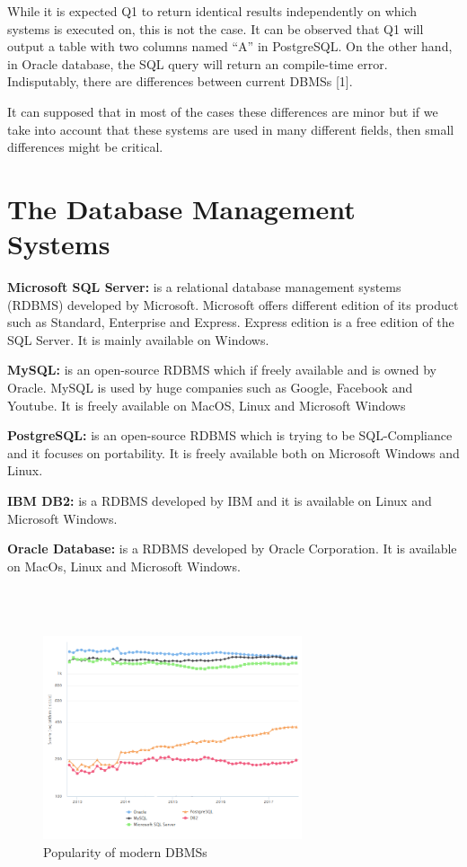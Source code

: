 While it is expected Q1 to return identical results independently on which systems is executed on, this is not the case. It can be observed that Q1 will output a table with two columns named “A” in PostgreSQL. On the other hand, in Oracle database, the SQL query will return an compile-time error. Ιndisputably, there are differences between current DBMSs [1]. 

It can supposed that in most of the cases these differences are minor but if we take into account that these systems are used in many different fields, then small differences might be critical. 

\section{The Database Management Systems} 

\textbf{Microsoft SQL Server:} is a relational database management systems (RDBMS) developed by Microsoft. Microsoft offers different edition of its product such as Standard, Enterprise and Express. Express edition is a free edition of the SQL Server. It is mainly available on Windows. 

\textbf{MySQL:} is an open-source RDBMS which if freely available and is owned by Oracle. MySQL is used by huge companies such as Google, Facebook and Youtube. It is freely available on MacOS, Linux and Microsoft Windows 

\textbf{PostgreSQL:} is an open-source RDBMS which is trying to be SQL-Compliance and it focuses on portability.  It is freely available both on Microsoft Windows and Linux. 

\textbf{IBM DB2:} is a RDBMS developed by IBM and it is available on Linux and Microsoft Windows. 

\textbf{Oracle Database:} is a RDBMS developed by Oracle Corporation. It is available on MacOs, Linux and Microsoft Windows. 


\hfill\\\\
 \begin{figure} 
      \centering
      \includegraphics[width=\textwidth,height=6cm]{Images/db_engines_chart}
      \caption{Popularity of modern DBMSs}
      \label{fig: Popularity of modern DBMSs}
    \end{figure}

